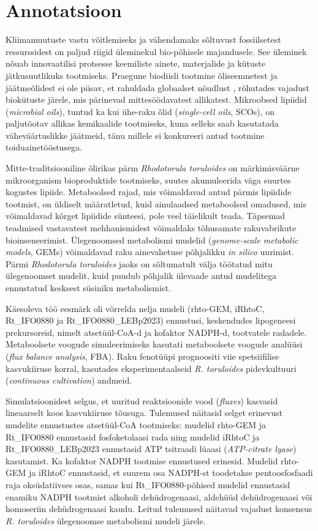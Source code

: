 \chapter*{Annotatsioon}
{}

Kliimamuutuste vastu võitlemiseks ja vähendamaks sõltuvust fossiilsetest ressurssidest on paljud riigid üleminekul bio-põhisele majandusele. See üleminek nõuab innovaatilisi protsesse keemiliste ainete, materjalide ja kütuste jätkusuutlikuks tootmiseks. Praegune biodiisli tootmine õliseemnetest ja jäätmeõlidest ei ole piisav, et rahuldada globaalset nõudlust \cite{Koutinas2014}, rõhutades vajadust biokütuste järele, mis pärinevad mittesöödavatest allikatest.
Mikroobsed lipiidid (\textit{microbial oils}), tuntud ka kui ühe-raku õlid (\textit{single-cell oils}, SCOs), on paljutõotav allikas kemikaalide tootmiseks, kuna selleks saab kasutatada väheväärtuslikke jäätmeid, tänu millele ei konkureeri antud tootmine toiduainetööstusega.

Mitte-traditsiooniline õlirikas pärm \textit{Rhodotorula toruloides} on märkimisväärne mikroorganism bioproduktide tootmiseks, suutes akumuleerida väga suurtes kogustes lipiide.
Metaboolsed rajad, mis võimaldavad antud pärmis lipiidide tootmist, on üldiselt määratletud, kuid ainulaadsed metaboolsed omadused, mis võimaldavad kõrget lipiidide sünteesi, pole veel täielikult 
teada. Täpsemad teadmised vastavatest mehhanismidest võimaldaks tõhusamate rakuvabrikute bioinseneerimist.
Ülegenoomsed metabolismi mudelid (\textit{genome-scale metabolic models}, GEMs) võimaldavad raku ainevahetuse põhjalikku \textit{in silico} uurimist. Pärmi \textit{Rhodotorula toruloides} jaoks on sõltumatult välja töötatud mitu ülegenoomset mudelit, kuid puudub põhjalik ülevaade antud mudelitega ennustatud kesksest süsiniku metabolismist.

Käesoleva töö eesmärk oli võrrelda nelja mudeli (rhto-GEM, iRhtoC, Rt\_IFO0880 ja Rt\_IFO0880\_LEBp2023) ennustusi, keskendudes lipogeneesi prekursoreid, nimelt atsetüül-CoA-d ja kofaktor NADPH-d, tootvatele radadele. Metaboolsete voogude simuleerimiseks kasutati metaboolsete voogude analüüsi (\textit{flux balance analysis}, FBA). Raku fenotüüpi prognoositi viie spetsiifilise kasvukiiruse korral, kasutades eksperimentaalseid \textit{R. toruloides} pidevkultuuri (\textit{continuous cultivation}) andmeid. 

Simulatsioonidest selgus, et uuritud reaktsioonide vood (\textit{fluxes}) kasvasid lineaarselt koos kasvukiiruse tõusuga.  
Tulemused näitasid selget erinevust mudelite ennustustes atsetüül-CoA tootmiseks: mudelid rhto-GEM ja Rt\_IFO0880 ennustasid fosfoketolaasi rada ning mudelid iRhtoC ja Rt\_IFO0880\_LEBp2023 ennustasid ATP tsitraadi lüaasi (\textit{ATP-citrate lyase}) kasutamist. Ka kofaktor NADPH tootmise ennustused erinesid. Mudelid rhto-GEM ja iRhtoC ennustasid, et suurem osa NADPH-st toodetakse pentoosfosfaadi raja oksüdatiivses osas, samas kui Rt\_IFO0880-põhised mudelid ennustasid enamiku NADPH tootmist alkoholi dehüdrogenaasi, aldehüüd dehüdrogenaasi või homoseriin dehüdrogenaasi kaudu. Leitud tulemused näitavad vajadust konsensus \textit{R. toruloides} ülegenoomse metabolismi mudeli järele.

